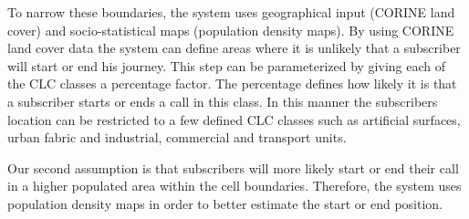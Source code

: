 To narrow these boundaries, the system uses geographical input (CORINE
land cover) and socio-statistical maps (population density maps).
By using CORINE land cover data the system can define areas where
it is unlikely that a subscriber will start or end his journey. This step can be
parameterized by giving each of the CLC classes a percentage factor. The
percentage defines how likely it is that a subscriber starts or ends a call in
this class. In this manner the subscribers location can be restricted to a few defined CLC classes such as 	artificial surfaces, urban fabric and industrial, commercial and transport units. 

Our second assumption is that subscribers will more likely start or end
their call in a higher populated area within the cell boundaries. Therefore,
the system uses population density maps in order to better estimate the
start or end position.

